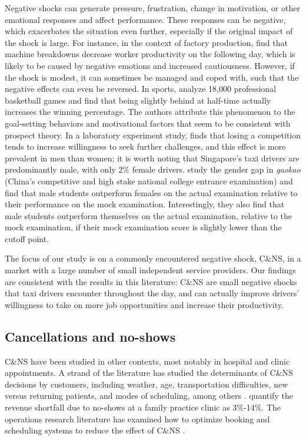 \documentclass[reviewmode,AEJ]{AEA}
\begin{document}
Negative shocks can generate pressure, frustration, change in motivation, or other emotional responses
and affect performance.  These responses can be negative, which exacerbates the situation even further,
especially if the original impact of the shock is large. For instance, in the context of factory production,
\citet{cai2017recover} find that machine breakdowns decrease worker productivity on the following day, which
is likely to be caused by negative emotions and increased cautiousness. However, if the shock is modest,
it can sometimes be managed and coped with, such that the negative effects can even be reversed. 
In sports, \citet{berger2011can} analyze 18,000 professional basketball games and find that being slightly
behind at half-time actually increases the winning percentage. The authors attribute this phenomenon to 
the goal-setting behaviors and motivational factors that seem to be consistent with prospect theory. 
In a laboratory experiment study, \citet{buser2016impact}  finds that losing a competition tends to 
increase willingness to seek further challenges, and this effect is more prevalent in men than women;
it is worth noting that Singapore's taxi drivers are predominantly male, with only 2\% female drivers.
\citet{cai2016gender} study the gender gap in \emph{gaokao} (China's competitive and high stake national
college entrance examination) and find that male students outperform females on the actual examination
relative to their performance on the mock examination. Interestingly, they also find that male students 
outperform themselves on the actual examination, relative to the mock examination, 
if their mock examination score is slightly lower than the cutoff point. 


The focus of our study is on a commonly encountered negative shock, C\&NS, in a market with a large number
of small independent service providers. Our findings are consistent with the results in this literature:
C\&NS are small negative shocks that taxi drivers encounter throughout the day,
and can actually improve drivers' willingness to take on more job opportunities and increase their productivity.

\subsection{Cancellations and no-shows}

C\&NS have been studied in other contexts, most notably in hospital and clinic appointments. 
A strand of the literature has studied the determinants of C\&NS decisions by customers, 
including weather, age, transportation difficulties, new versus returning patients, 
and modes of scheduling, among others \citep{norris2014empirical}. \citet{moore2001time} quantify the
revenue shortfall due to no-shows at a family practice clinic as 3\%-14\%. The operations research 
literature has examined how to optimize booking and scheduling systems to reduce the effect of C\&NS
\citep{feldman2014appointment,patrick2008reducing}.
\end{document}
